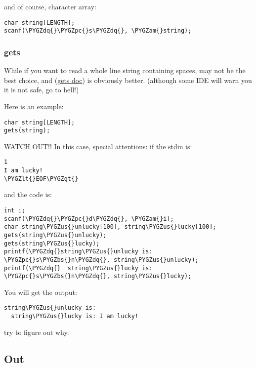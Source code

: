 \documentclass[letterpaper,10pt,english]{sphinxmanual}
\def\PYGZbs{\char`\\}
\def\PYGZus{\char`\_}
\def\PYGZam{\char`\&}
\def\PYGZlt{\char`\<}
\def\PYGZgt{\char`\>}
\def\PYGZpc{\char`\%}
\def\PYGZdq{\char`\"}
\begin{document}
and of course, character array:

\begin{Verbatim}[commandchars=\\\{\}]
char string[LENGTH];
scanf(\PYGZdq{}\PYGZpc{}s\PYGZdq{}, \PYGZam{}string);
\end{Verbatim}


\subsubsection{gets}
\label{topics/io:gets}
While if you want to read a whole line string containing spaces,  may not
be the best choice, and  (\href{http://en.cppreference.com/w/cpp/io/c/gets}{gets doc}) is obviously better. (although some IDE will warn
you it is not safe, go to hell!)

Here is an example:

\begin{Verbatim}[commandchars=\\\{\}]
char string[LENGTH];
gets(string);
\end{Verbatim}

WATCH OUT!! In this case, special attentions: if the stdin is:

\begin{Verbatim}[commandchars=\\\{\}]
1
I am lucky!
\PYGZlt{}EOF\PYGZgt{}
\end{Verbatim}

and the code is:

\begin{Verbatim}[commandchars=\\\{\}]
int i;
scanf(\PYGZdq{}\PYGZpc{}d\PYGZdq{}, \PYGZam{}i);
char string\PYGZus{}unlucky[100], string\PYGZus{}lucky[100];
gets(string\PYGZus{}unlucky);
gets(string\PYGZus{}lucky);
printf(\PYGZdq{}string\PYGZus{}unlucky is: \PYGZpc{}s\PYGZbs{}n\PYGZdq{}, string\PYGZus{}unlucky);
printf(\PYGZdq{}  string\PYGZus{}lucky is: \PYGZpc{}s\PYGZbs{}n\PYGZdq{}, string\PYGZus{}lucky);
\end{Verbatim}

You will get the output:

\begin{Verbatim}[commandchars=\\\{\}]
string\PYGZus{}unlucky is:
  string\PYGZus{}lucky is: I am lucky!
\end{Verbatim}

try to figure out why.


\subsection{Out}
\label{topics/io:out}
\end{document}

